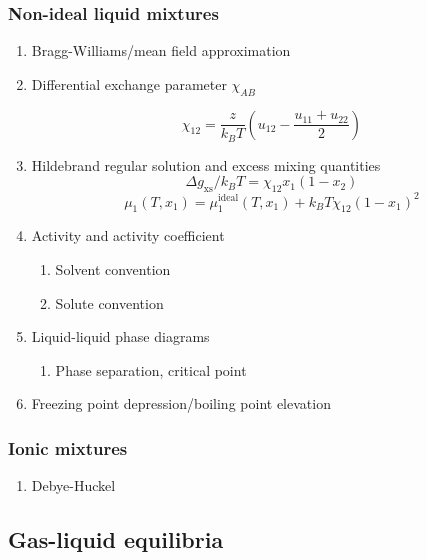 \documentclass[11pt]{article}
\begin{document}
\subsubsection{Non-ideal liquid mixtures}
\label{sec:orgb4ff18f}
\begin{enumerate}
\item Bragg-Williams/mean field approximation
\item Differential exchange parameter \(\chi_{AB}\)

\begin{equation*}
   \chi_{12} = \frac{z}{k_BT}\left ( u_{12} - \frac{u_\text{11} +
    u_\text{22}}{2} \right )
\end{equation*}

\item Hildebrand regular solution and excess mixing quantities
\begin{equation*}
   \Delta g_\text{xs}/k_BT = \chi_{12} x_1(1-x_2)
\end{equation*}
\begin{equation*}
    \mu_1(T,x_1) = \mu_1^\text{ideal}(T,x_1) + k_B T \chi_{12} (1-x_1)^2
\end{equation*}
\item Activity and activity coefficient
\begin{enumerate}
\item Solvent convention
\item Solute convention
\end{enumerate}
\item Liquid-liquid phase diagrams
\begin{enumerate}
\item Phase separation, critical point
\end{enumerate}
\item Freezing point depression/boiling point elevation
\end{enumerate}
\subsubsection{Ionic mixtures}
\label{sec:org6938dd3}
\begin{enumerate}
\item Debye-Huckel
\end{enumerate}

\subsection{Gas-liquid equilibria}
\label{sec:orgda4c665}
\end{document}
